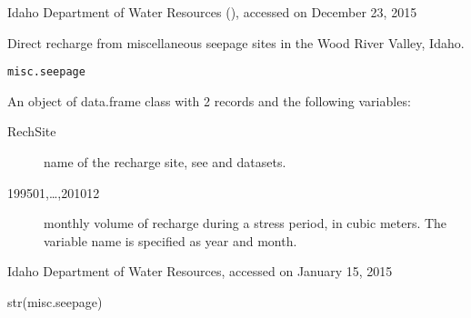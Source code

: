 \documentclass[a4paper]{book}
\begin{document}
%
\begin{Source}\relax
Idaho Department of Water Resources
(),
accessed on December 23, 2015
\end{Source}
%
\begin{Examples}
\end{Examples}
%
\begin{Description}\relax
Direct recharge from miscellaneous seepage sites in the Wood River Valley, Idaho.
\end{Description}
%
\begin{Usage}
\begin{verbatim}
misc.seepage
\end{verbatim}
\end{Usage}
%
\begin{Format}
An object of data.frame class with 2 records and the following variables:
\begin{description}

\item[RechSite] name of the recharge site, see  and
 datasets.
\item[199501,\dots,201012] monthly volume of recharge during a stress period, in cubic meters.
The variable name is specified as year and month.

\end{description}

\end{Format}
%
\begin{Source}\relax
Idaho Department of Water Resources, accessed on January 15, 2015
\end{Source}
%
\begin{Examples}
\begin{ExampleCode}
str(misc.seepage)

\end{ExampleCode}
\end{Examples}
\end{document}
